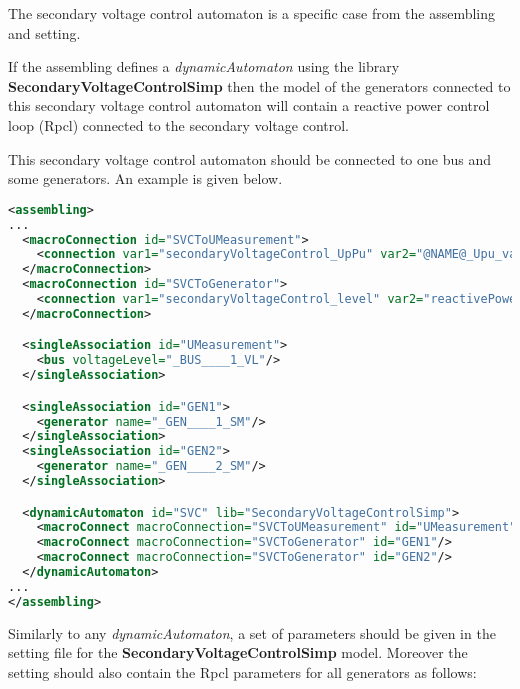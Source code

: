 \documentclass[a4paper, 12pt]{report}
\begin{document}
The secondary voltage control automaton is a specific case from the assembling and setting.

If the assembling defines a \textit{dynamicAutomaton} using the library \textbf{SecondaryVoltageControlSimp} then the model of the generators connected to
this secondary voltage control automaton will contain a reactive power control loop (Rpcl) connected to the secondary voltage control.

This secondary voltage control automaton should be connected to one bus and some generators.
An example is given below.

\begin{lstlisting}[language=XML, breaklines=true, breakatwhitespace=false, columns=fullflexible]
<assembling>
...
  <macroConnection id="SVCToUMeasurement">
    <connection var1="secondaryVoltageControl_UpPu" var2="@NAME@_Upu_value"/>
  </macroConnection>
  <macroConnection id="SVCToGenerator">
    <connection var1="secondaryVoltageControl_level" var2="reactivePowerControlLoop_level"/>
  </macroConnection>

  <singleAssociation id="UMeasurement">
    <bus voltageLevel="_BUS____1_VL"/>
  </singleAssociation>

  <singleAssociation id="GEN1">
    <generator name="_GEN____1_SM"/>
  </singleAssociation>
  <singleAssociation id="GEN2">
    <generator name="_GEN____2_SM"/>
  </singleAssociation>

  <dynamicAutomaton id="SVC" lib="SecondaryVoltageControlSimp">
    <macroConnect macroConnection="SVCToUMeasurement" id="UMeasurement"/>
    <macroConnect macroConnection="SVCToGenerator" id="GEN1"/>
    <macroConnect macroConnection="SVCToGenerator" id="GEN2"/>
  </dynamicAutomaton>
...
</assembling>
\end{lstlisting}


Similarly to any \textit{dynamicAutomaton}, a set of parameters should be given in the setting file for the \textbf{SecondaryVoltageControlSimp} model.
Moreover the setting should also contain the Rpcl parameters for all generators as follows:
\end{document}
